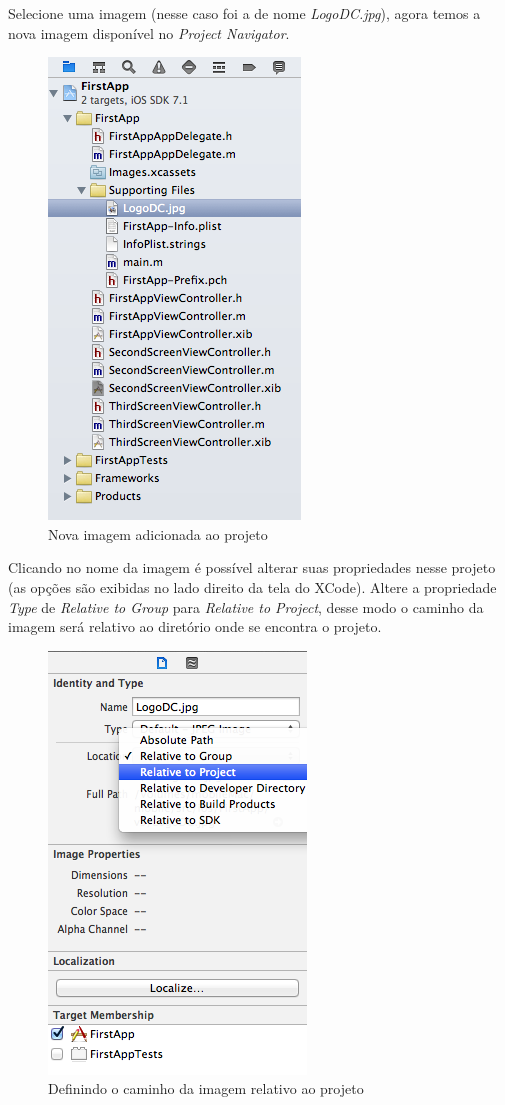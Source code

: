 \documentclass[a4paper,12pt,brazil,doubleside]{book}
\begin{document}
\begin{singlespace}
Selecione uma imagem (nesse caso foi a de nome \emph{LogoDC.jpg}), agora temos a nova imagem disponível no \emph{Project Navigator}.

\begin{figure}[H]
  \centering
  \includegraphics[scale=0.6]{figuras/3/tela_novo_projeto_50.png}
  \caption{Nova imagem adicionada ao projeto}
  \label{fig:a}
\end{figure}


Clicando no nome da imagem é possível alterar suas propriedades nesse projeto (as opções são exibidas no lado direito da tela do XCode). Altere a propriedade \emph{Type} de \emph{Relative to Group} para \emph{Relative to Project}, desse modo o caminho da imagem será relativo ao diretório onde se encontra o projeto.

\begin{figure}[H]
  \centering
  \includegraphics[scale=0.6]{figuras/3/tela_novo_projeto_51.png}
  \caption{Definindo o caminho da imagem relativo ao projeto}
  \label{fig:a}
\end{figure}



\end{singlespace}
\end{document}
